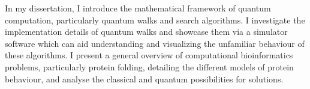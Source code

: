 In my dissertation, I introduce the mathematical framework of quantum computation, particularly quantum walks and search algorithms. I investigate the implementation details of quantum walks and showcase them via a simulator software which can aid understanding and visualizing the unfamiliar behaviour of these algorithms. I present a general overview of computational bioinformatics problems, particularly protein folding, detailing the different models of protein behaviour, and analyse the classical and quantum possibilities for solutions.

\vfill
\selectthesislanguage

\setcounter{romanPage}{\value{page}}
